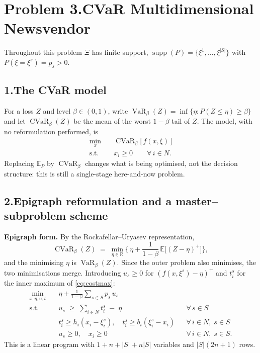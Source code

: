 \documentclass[11pt]{article}
\DeclareMathOperator*{\minimize}{min}
\DeclareMathOperator{\CVaR}{CVaR}
\DeclareMathOperator{\VaR}{VaR}
\DeclareMathOperator{\supp}{supp}
\theoremstyle{definition}
\begin{document}
\newpage
\section*{Problem 3.\quad CVaR Multidimensional Newsvendor
  }

Throughout this problem $\Xi$ has finite support,
$\supp(P) = \{\xi^1,\dots,\xi^{|S|}\}$ with $P(\xi = \xi^s) = p_s > 0$.

\subsection*{1.\quad The CVaR model}

For a loss $Z$ and level $\beta \in (0,1)$, write
$\VaR_\beta(Z) = \inf\{\eta : P(Z \le \eta) \ge \beta\}$ and let
$\CVaR_\beta(Z)$ be the mean of the worst $1-\beta$ tail of $Z$. The model,
with no reformulation performed, is
\begin{align}
  \minimize_{x} \quad & \CVaR_\beta\big[\, f(x,\xi) \,\big] \\
  \text{s.t.}\quad & x_i \ge 0 \qquad \forall\, i \in N .
\end{align}
Replacing $\mathbb{E}_P$ by $\CVaR_\beta$ changes what is being optimised,
not the decision structure: this is still a single-stage here-and-now
problem.

\subsection*{2.\quad Epigraph reformulation and a master--subproblem
  scheme}

\textbf{Epigraph form.} By the Rockafellar--Uryasev representation,
\begin{equation}
  \CVaR_\beta(Z) \;=\; \min_{\eta \in \mathbb{R}}
    \Big\{\, \eta + \frac{1}{1-\beta}\,
      \mathbb{E}\big[(Z-\eta)^{+}\big] \Big\},
  \label{eq:ru}
\end{equation}
and the minimising $\eta$ is $\VaR_\beta(Z)$. Since the outer problem also
minimises, the two minimisations merge. Introducing
$u_s \ge 0$ for $(f(x,\xi^s)-\eta)^{+}$ and $t^{s}_i$ for the inner
maximum of \eqref{eq:costmax}:
\begin{align}
  \minimize_{x,\eta,u,t} \quad
    & \eta + \frac{1}{1-\beta} \sum_{s \in S} p_s\, u_s \\
  \text{s.t.}\quad
    & u_s \;\ge\; \sum_{i\in N} t^{s}_i \;-\; \eta && \forall\, s \in S \\
    & t^{s}_i \ge h_i(x_i - \xi^{s}_i),\quad
      t^{s}_i \ge b_i(\xi^{s}_i - x_i) && \forall\, i \in N,\; s \in S \\
    & u_s \ge 0,\quad x_i \ge 0 && \forall\, i \in N,\; s \in S .
\end{align}
This is a linear program with $1 + n + |S| + n|S|$ variables and
$|S|(2n+1)$ rows.
\end{document}
